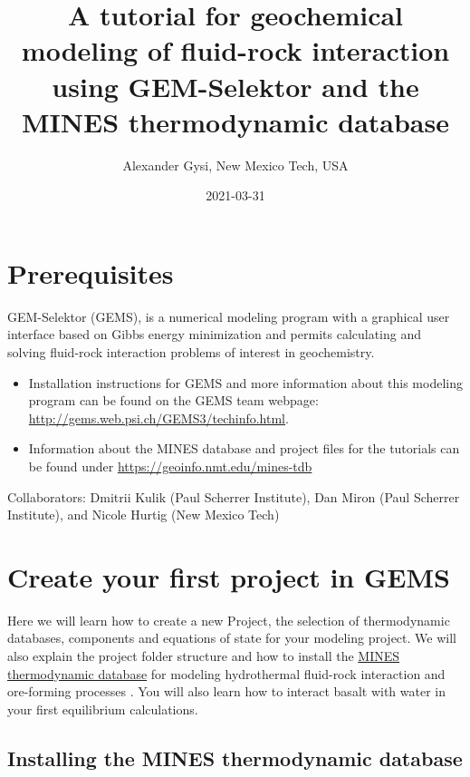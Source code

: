 \documentclass[
]{book}
\title{A tutorial for geochemical modeling of fluid-rock interaction using GEM-Selektor and the MINES thermodynamic database}
\author{Alexander Gysi, New Mexico Tech, USA}
\date{2021-03-31}
\begin{document}
\maketitle

{
\setcounter{tocdepth}{1}
\tableofcontents
}
\hypertarget{prerequisites}{%
\chapter*{Prerequisites}\label{prerequisites}}

GEM-Selektor (GEMS), is a numerical modeling program with a graphical user interface based on Gibbs energy minimization and permits calculating and solving fluid-rock interaction problems of interest in geochemistry.

\begin{itemize}
\item
  Installation instructions for GEMS and more information about this modeling program can be found on the GEMS team webpage: \url{http://gems.web.psi.ch/GEMS3/techinfo.html}.
\item
  Information about the MINES database and project files for the tutorials can be found under \url{https://geoinfo.nmt.edu/mines-tdb}
\end{itemize}

Collaborators:
Dmitrii Kulik (Paul Scherrer Institute), Dan Miron (Paul Scherrer Institute), and Nicole Hurtig (New Mexico Tech)

\hypertarget{intro}{%
\chapter{Create your first project in GEMS}\label{intro}}

Here we will learn how to create a new Project, the selection of thermodynamic databases, components and equations of state for your modeling project. We will also explain the project folder structure and how to install the \href{https://geoinfo.nmt.edu/mines-tdb}{MINES thermodynamic database} for modeling hydrothermal fluid-rock interaction and ore-forming processes . You will also learn how to interact basalt with water in your first equilibrium calculations.

\hypertarget{installing-the-mines-thermodynamic-database}{%
\section{Installing the MINES thermodynamic database}\label{installing-the-mines-thermodynamic-database}}
\end{document}
